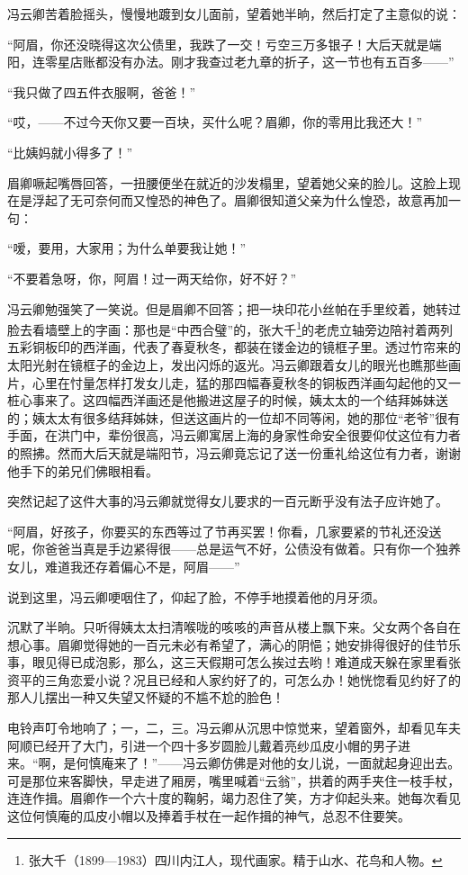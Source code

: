 \par 冯云卿苦着脸摇头，慢慢地踱到女儿面前，望着她半晌，然后打定了主意似的说：
\par “阿眉，你还没晓得这次公债里，我跌了一交！亏空三万多银子！大后天就是端阳，连零星店账都没有办法。刚才我查过老九章的折子，这一节也有五百多——”
\par “我只做了四五件衣服啊，爸爸！”
\par “哎，——不过今天你又要一百块，买什么呢？眉卿，你的零用比我还大！”
\par “比姨妈就小得多了！”
\par 眉卿噘起嘴唇回答，一扭腰便坐在就近的沙发榻里，望着她父亲的脸儿。这脸上现在是浮起了无可奈何而又惶恐的神色了。眉卿很知道父亲为什么惶恐，故意再加一句：
\par “嗳，要用，大家用；为什么单要我让她！”
\par “不要着急呀，你，阿眉！过一两天给你，好不好？”
\par 冯云卿勉强笑了一笑说。但是眉卿不回答；把一块印花小丝帕在手里绞着，她转过脸去看墙壁上的字画：那也是“中西合璧”的，张大千\footnote{张大千（1899—1983）四川内江人，现代画家。精于山水、花鸟和人物。}的老虎立轴旁边陪衬着两列五彩铜板印的西洋画，代表了春夏秋冬，都装在镂金边的镜框子里。透过竹帘来的太阳光射在镜框子的金边上，发出闪烁的返光。冯云卿跟着女儿的眼光也瞧那些画片，心里在忖量怎样打发女儿走，猛的那四幅春夏秋冬的铜板西洋画勾起他的又一桩心事来了。这四幅西洋画还是他搬进这屋子的时候，姨太太的一个结拜姊妹送的；姨太太有很多结拜姊妹，但送这画片的一位却不同等闲，她的那位“老爷”很有手面，在洪门中，辈份很高，冯云卿寓居上海的身家性命安全很要仰仗这位有力者的照拂。然而大后天就是端阳节，冯云卿竟忘记了送一份重礼给这位有力者，谢谢他手下的弟兄们佛眼相看。
\par 突然记起了这件大事的冯云卿就觉得女儿要求的一百元断乎没有法子应许她了。
\par “阿眉，好孩子，你要买的东西等过了节再买罢！你看，几家要紧的节礼还没送呢，你爸爸当真是手边紧得很——总是运气不好，公债没有做着。只有你一个独养女儿，难道我还存着偏心不是，阿眉——”
\par 说到这里，冯云卿哽咽住了，仰起了脸，不停手地摸着他的月牙须。
\par 沉默了半晌。只听得姨太太扫清喉咙的咳咳的声音从楼上飘下来。父女两个各自在想心事。眉卿觉得她的一百元未必有希望了，满心的阴悒；她安排得很好的佳节乐事，眼见得已成泡影，那么，这三天假期可怎么挨过去哟！难道成天躲在家里看张资平的三角恋爱小说？况且已经和人家约好了的，可怎么办！她恍惚看见约好了的那人儿摆出一种又失望又怀疑的不尴不尬的脸色！
\par 电铃声叮令地响了；一，二，三。冯云卿从沉思中惊觉来，望着窗外，却看见车夫阿顺已经开了大门，引进一个四十多岁圆脸儿戴着亮纱瓜皮小帽的男子进来。“啊，是何慎庵来了！”——冯云卿仿佛是对他的女儿说，一面就起身迎出去。可是那位来客脚快，早走进了厢房，嘴里喊着“云翁”，拱着的两手夹住一枝手杖，连连作揖。眉卿作一个六十度的鞠躬，竭力忍住了笑，方才仰起头来。她每次看见这位何慎庵的瓜皮小帽以及捧着手杖在一起作揖的神气，总忍不住要笑。
